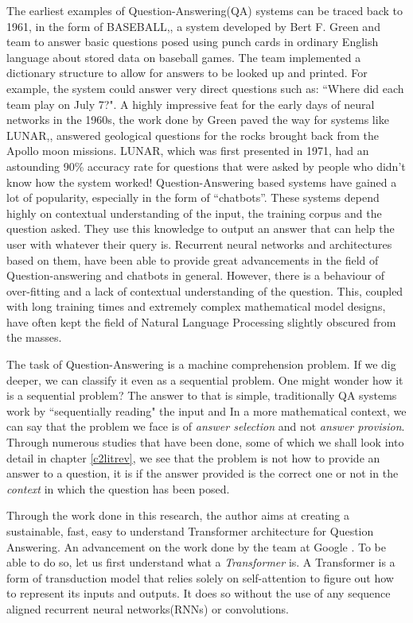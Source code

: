 \documentclass[a4paper,12pt]{report}
\begin{document}
    The earliest examples of Question-Answering(QA) systems can be traced back to 1961, in the form of BASEBALL,\citep{green1961baseball}, a system developed by Bert F. Green and team to answer basic questions posed using punch cards in ordinary English language about stored data on baseball games. The team implemented a dictionary structure to allow for answers to be looked up and printed. For example, the system could answer very direct questions such as: ``Where did each team play on July 7?".
    A highly impressive feat for the early days of neural networks in the 1960s, the work done by Green paved the way for systems like LUNAR,\citep{lunar}, answered geological questions for the rocks brought back from the Apollo moon missions. LUNAR, which was first presented in 1971, had an astounding 90\% accuracy rate for questions that were asked by people who didn't know how the system worked!
    Question-Answering based systems have gained a lot of popularity, especially in the form of ``chatbots''. These systems depend highly on contextual understanding of the input, the training corpus and the question asked. They use this knowledge to output an answer that can help the user with whatever their query is. Recurrent neural networks and architectures based on them, have been able to provide great advancements in the field of Question-answering and chatbots in general. However, there is a behaviour of over-fitting and a lack of contextual understanding of the question. This, coupled with long training times and extremely complex mathematical model designs, have often kept the field of Natural Language Processing slightly obscured from the masses.


    The task of Question-Answering is a machine comprehension problem. If we dig deeper, we can classify it even as a sequential problem. One might wonder how it is a sequential problem? The answer to that is simple, traditionally QA systems work by ``sequentially reading" the input and
    In a more mathematical context, we can say that the problem we face is of \textit{answer selection} and not \textit{answer provision}. Through numerous studies that have been done, some of which we shall look into detail in chapter \ref{c2litrev}, we see that the problem is not how to provide an answer to a question, it is if the answer provided is the correct one or not in the \textit{context} in which the question has been posed.

    Through the work done in this research, the author aims at creating a sustainable, fast, easy to understand Transformer architecture for Question Answering. An advancement on the work done by the team at Google \citep{atayl}. To be able to do so, let us first understand what a \textit{Transformer} is.
    A Transformer is a form of transduction model that relies solely on self-attention to figure out how to represent its inputs and outputs. It does so without the use of any sequence aligned recurrent neural networks(RNNs) or convolutions.
\end{document}
